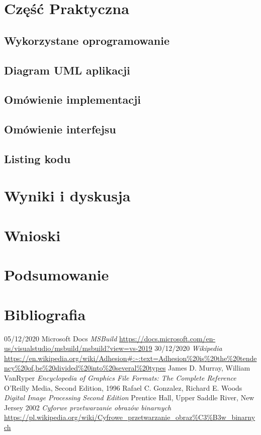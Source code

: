 \documentclass{article}
\begin{document}
    \section{Część Praktyczna}
        \subsection{Wykorzystane oprogramowanie}
        \subsection{Diagram UML aplikacji}
        \subsection{Omówienie implementacji}
        \subsection{Omówienie interfejsu}
        \subsection{Listing kodu}
    \newpage
    \section{Wyniki i dyskusja}
    \section{Wnioski}
    \newpage
    \section{Podsumowanie}
    \newpage
    \section{Bibliografia}
    \begin{thebibliography}{9}
        05/12/2020
        Microsoft Docs
        \textit{MSBuild}
        \url{https://docs.microsoft.com/en-us/visualstudio/msbuild/msbuild?view=vs-2019}
        30/12/2020
        \textit{Wikipedia}
        \url{https://en.wikipedia.org/wiki/Adhesion#:~:text=Adhesion%20is%20the%20tendency%20of,be%20divided%20into%20several%20types}
        James D. Murray, William VanRyper
        \textit{Encyclopedia of Graphics File Formats: The Complete Reference}
        O'Reilly Media, Second Edition, 1996
        Rafael C. Gonzalez, Richard E. Woods
        \textit{Digital Image Processing Second Edition}
        Prentice Hall, Upper Saddle River, New Jersey 2002 
        \textit{Cyforwe przetwarzanie obrazów binarnych}
        \url{https://pl.wikipedia.org/wiki/Cyfrowe_przetwarzanie_obraz%C3%B3w_binarnych}
    \end{thebibliography}
    \newpage
    \listoffigures
\end{document}
